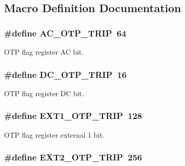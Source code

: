 \subsection{Macro Definition Documentation}
\hypertarget{a00034_a339a1358cf8dfd3ea7a81342bb32d399}{
\subsubsection[{A\-C\-\_\-\-O\-T\-P\-\_\-\-T\-R\-I\-P}]{\setlength{\rightskip}{0pt plus 5cm}\#define A\-C\-\_\-\-O\-T\-P\-\_\-\-T\-R\-I\-P~64}}\label{a00034_a339a1358cf8dfd3ea7a81342bb32d399}
O\-T\-P flag register A\-C bit. \hypertarget{a00034_aabece239f4e25bd4b48f0535ff667c46}{
\subsubsection[{D\-C\-\_\-\-O\-T\-P\-\_\-\-T\-R\-I\-P}]{\setlength{\rightskip}{0pt plus 5cm}\#define D\-C\-\_\-\-O\-T\-P\-\_\-\-T\-R\-I\-P~16}}\label{a00034_aabece239f4e25bd4b48f0535ff667c46}
O\-T\-P flag register D\-C bit. \hypertarget{a00034_a91ac28ba381b421811645935e398c8c4}{
\subsubsection[{E\-X\-T1\-\_\-\-O\-T\-P\-\_\-\-T\-R\-I\-P}]{\setlength{\rightskip}{0pt plus 5cm}\#define E\-X\-T1\-\_\-\-O\-T\-P\-\_\-\-T\-R\-I\-P~128}}\label{a00034_a91ac28ba381b421811645935e398c8c4}
O\-T\-P flag register external 1 bit. \hypertarget{a00034_acb47b2c45d5513cb21e25ae252a7bec1}{
\subsubsection[{E\-X\-T2\-\_\-\-O\-T\-P\-\_\-\-T\-R\-I\-P}]{\setlength{\rightskip}{0pt plus 5cm}\#define E\-X\-T2\-\_\-\-O\-T\-P\-\_\-\-T\-R\-I\-P~256}}\label{a00034_acb47b2c45d5513cb21e25ae252a7bec1}
